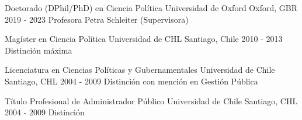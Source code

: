 





\begin{cventries}

\vspace{0.5mm}
\cventry
{Doctorado (DPhil/PhD) en Ciencia Política} 
{Universidad de Oxford} 
{Oxford, GBR} 
{2019 - 2023} 
{Profesora Petra Schleiter (Supervisora)} \vspace{1.5mm}

\cventry
{Magíster en Ciencia Política} 
{Universidad de CHL} 
{Santiago, Chile} 
{2010 - 2013} 
{Distinción máxima} \vspace{1.5mm}

\cventry
{Licenciatura en Ciencias Políticas y Gubernamentales} 
{Universidad de Chile} 
{Santiago, CHL} 
{2004 - 2009} 
{Distinción con mención en Gestión Pública} \vspace{1.5mm}

\cventry
{Título Profesional de Administrador Público} 
{Universidad de Chile} 
{Santiago, CHL} 
{2004 - 2009} 
{Distinción}\vspace{1.5mm}

\end{cventries}
